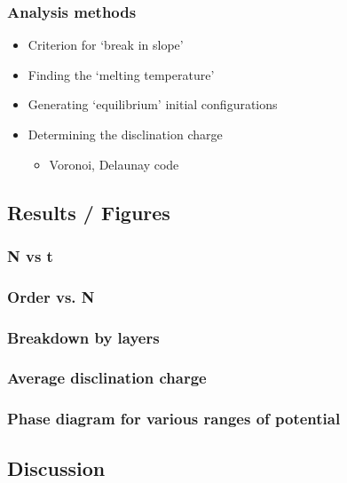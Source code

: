 \documentclass[11pt]{article}
\begin{document}
\subsubsection{Analysis methods}
\label{sec-3-2-3}
\begin{itemize}

\item Criterion for `break in slope'\\
\label{sec-3-2-3-1}%
\item Finding the `melting temperature'\\
\label{sec-3-2-3-2}%
\item Generating `equilibrium' initial configurations\\
\label{sec-3-2-3-3}%
\item Determining the disclination charge
\label{sec-3-2-3-4}%
\begin{itemize}

\item Voronoi, Delaunay code\\
\label{sec-3-2-3-4-1}%
\end{itemize} %
\end{itemize} %
\subsection{Results / Figures}
\label{sec-3-3}
\subsubsection{N vs t}
\label{sec-3-3-1}
\subsubsection{Order vs. N}
\label{sec-3-3-2}
\subsubsection{Breakdown by layers}
\label{sec-3-3-3}
\subsubsection{Average disclination charge}
\label{sec-3-3-4}
\subsubsection{Phase diagram for various ranges of potential}
\label{sec-3-3-5}
\subsection{Discussion}
\label{sec-3-4}
\end{document}
